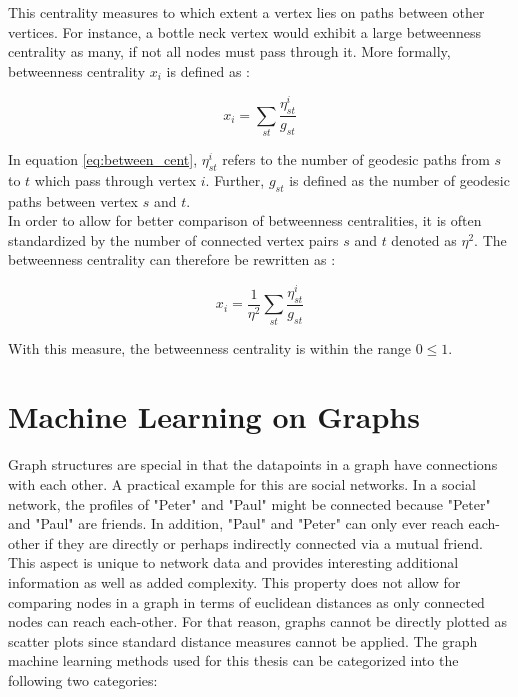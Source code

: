 	\noindent This centrality measures to which extent a vertex lies on paths 
	between other vertices. For instance, a bottle neck vertex would exhibit a 
	large betweenness centrality as many, if not all nodes must pass through it. 
	More formally, betweenness centrality $x_i$ is defined as 
	\citep[p. 187]{Newman2010}:

	\begin{equation}
		x_i = \sum_{st} \frac{\eta_{st}^i}{g_{st}}
		\label{eq:between_cent}
	\end{equation}

	\noindent In equation \ref{eq:between_cent}, $\eta_{st}^i$ refers to the 
	number of geodesic paths from $s$ to $t$ which pass through vertex $i$. 
	Further, $g_{st}$ is defined as the number of geodesic paths between vertex 
	$s$ and $t$. \\

	\noindent In order to allow for better comparison of betweenness
	centralities, it is often standardized by the number of connected vertex
	pairs $s$ and $t$ denoted as  $\eta^2$. The betweenness centrality
	can therefore be rewritten as \citep[p.190]{Newman2010}:

	\begin{equation}
		x_i = \frac{1}{\eta^2}\sum_{st} \frac{\eta_{st}^i}{g_{st}}
	\end{equation}

	\noindent With this measure, the betweenness centrality is within the range
	$0\leqslant1$.

	\section{Machine Learning on Graphs}

	\noindent Graph structures are special in that the datapoints in a graph 
	have connections with each other. A practical example for this are social 
	networks. In a social network, the profiles of "Peter" and "Paul" might be 
	connected because "Peter" and "Paul" are friends. In addition, "Paul" and 
	"Peter" can only ever reach each-other if they are directly or perhaps 
	indirectly connected via a mutual friend. This aspect is unique to network 
	data and provides interesting additional information as well as added
	complexity. This property does not allow for comparing nodes in a graph in 
	terms of euclidean distances as only connected nodes can reach each-other.
	For that reason, graphs cannot be directly plotted as scatter plots since
	standard distance measures cannot be applied. The graph machine learning 
	methods used for this thesis can be categorized into the following two 
	categories:

